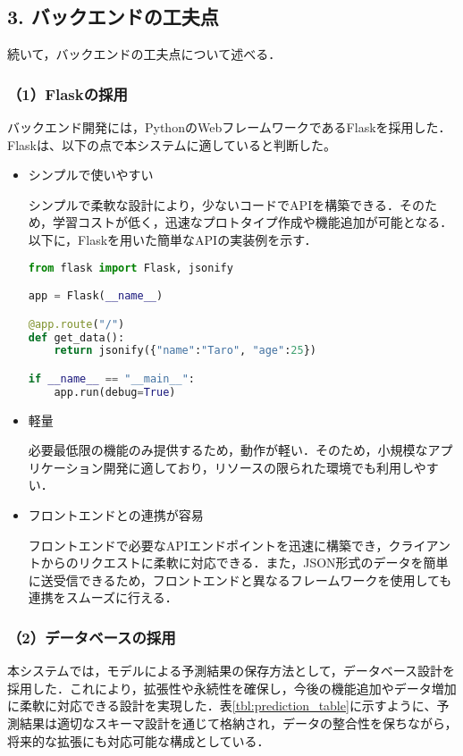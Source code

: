 \subsection*{3. バックエンドの工夫点}

続いて，バックエンドの工夫点について述べる．

\subsubsection*{（1）Flaskの採用}
バックエンド開発には，PythonのWebフレームワークであるFlaskを採用した．Flaskは、以下の点で本システムに適していると判断した。

\begin{itemize}
	\item シンプルで使いやすい
	
	シンプルで柔軟な設計により，少ないコードでAPIを構築できる．そのため，学習コストが低く，迅速なプロトタイプ作成や機能追加が可能となる．以下に，Flaskを用いた簡単なAPIの実装例を示す．
\begin{lstlisting}[style=mystyle, language=Python, caption=Flaskによる簡単なAPIの実装例]
from flask import Flask, jsonify

app = Flask(__name__)

@app.route("/")
def get_data():
	return jsonify({"name":"Taro", "age":25})

if __name__ == "__main__":
	app.run(debug=True)
\end{lstlisting}
	
	\item 軽量
	
	必要最低限の機能のみ提供するため，動作が軽い．そのため，小規模なアプリケーション開発に適しており，リソースの限られた環境でも利用しやすい．

	\item フロントエンドとの連携が容易
	 
	フロントエンドで必要なAPIエンドポイントを迅速に構築でき，クライアントからのリクエストに柔軟に対応できる．また，JSON形式のデータを簡単に送受信できるため，フロントエンドと異なるフレームワークを使用しても連携をスムーズに行える．
\end{itemize}

\subsubsection*{（2）データベースの採用}
本システムでは，モデルによる予測結果の保存方法として，データベース設計を採用した．これにより，拡張性や永続性を確保し，今後の機能追加やデータ増加に柔軟に対応できる設計を実現した．表\ref{tbl:prediction_table}に示すように、予測結果は適切なスキーマ設計を通じて格納され，データの整合性を保ちながら，将来的な拡張にも対応可能な構成としている．

